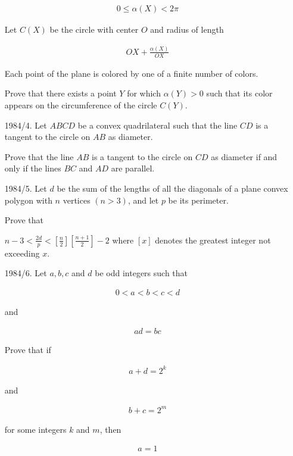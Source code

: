 \documentclass[12pt]{article}
\begin{document}
\begin{enumerate}
\begin{align*}
0 \leq \alpha(X) < 2\pi
\end{align*}

Let $C(X)$ be the circle with center $O$ and radius of length

\begin{align*}
OX+\frac{\alpha(X)}{OX}
\end{align*}

Each point of the plane is colored by one of a finite number of colors.

Prove that there exists a point $Y$ for which $\alpha(Y)>0$ such that its color appears on the circumference of the circle $C(Y)$.

\vspace{0.5cm}

\item[1984/4.]
Let $ABCD$ be a convex quadrilateral such that the line $CD$ is a tangent to the circle on $AB$ as diameter.

Prove that the line $AB$ is a tangent to the circle on $CD$ as diameter if and only if the lines $BC$ and $AD$ are parallel.

\vspace{0.5cm}

\item[1984/5.]
Let $d$ be the sum of the lengths of all the diagonals of a plane convex polygon with $n$ vertices $(n>3)$, and let $p$ be its perimeter.

Prove that

$n-3<\frac{2d}{p}<\left[\frac{n}{2}\right]\left[\frac{n+1}{2}\right]-2$
where $[x]$ denotes the greatest integer not exceeding $x$.

\vspace{0.5cm}

\item[1984/6.]
Let $a,b,c$ and $d$ be odd integers such that

\begin{align*}
0<a<b<c<d
\end{align*}


and

\begin{align*}
ad=bc
\end{align*}

Prove that if

\begin{align*}
a+d=2^k
\end{align*}

and

\begin{align*}
b+c=2^m
\end{align*}

for some integers $k$ and $m$, then

\begin{align*}
a=1
\end{align*}

\end{enumerate}
\end{document}
